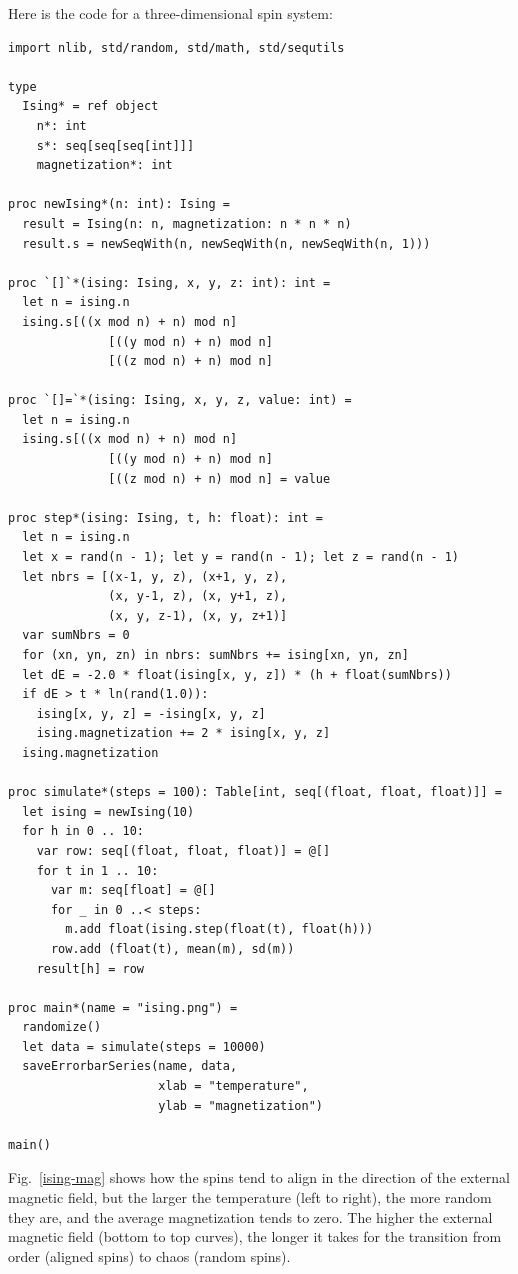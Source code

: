 \documentclass[justified, sixbynine]{tufte-book}
\def\ft{\small\tt}
\theoremstyle{plain}%
\newtheorem * {corollary}{Corollary}
\theoremstyle{definition}
\theoremstyle{remark}
\newtheorem * {remark}{Remark}
\newtheorem * {note}{Note}
\begin{document}
\begin{fullwidth}
Here is the code for a three-dimensional spin system:


\begin{lstlisting}[caption={in file: {\ft ising.nim}}]
import nlib, std/random, std/math, std/sequtils

type
  Ising* = ref object
    n*: int
    s*: seq[seq[seq[int]]]
    magnetization*: int

proc newIsing*(n: int): Ising =
  result = Ising(n: n, magnetization: n * n * n)
  result.s = newSeqWith(n, newSeqWith(n, newSeqWith(n, 1)))

proc `[]`*(ising: Ising, x, y, z: int): int =
  let n = ising.n
  ising.s[((x mod n) + n) mod n]
              [((y mod n) + n) mod n]
              [((z mod n) + n) mod n]

proc `[]=`*(ising: Ising, x, y, z, value: int) =
  let n = ising.n
  ising.s[((x mod n) + n) mod n]
              [((y mod n) + n) mod n]
              [((z mod n) + n) mod n] = value

proc step*(ising: Ising, t, h: float): int =
  let n = ising.n
  let x = rand(n - 1); let y = rand(n - 1); let z = rand(n - 1)
  let nbrs = [(x-1, y, z), (x+1, y, z),
              (x, y-1, z), (x, y+1, z),
              (x, y, z-1), (x, y, z+1)]
  var sumNbrs = 0
  for (xn, yn, zn) in nbrs: sumNbrs += ising[xn, yn, zn]
  let dE = -2.0 * float(ising[x, y, z]) * (h + float(sumNbrs))
  if dE > t * ln(rand(1.0)):
    ising[x, y, z] = -ising[x, y, z]
    ising.magnetization += 2 * ising[x, y, z]
  ising.magnetization

proc simulate*(steps = 100): Table[int, seq[(float, float, float)]] =
  let ising = newIsing(10)
  for h in 0 .. 10:
    var row: seq[(float, float, float)] = @[]
    for t in 1 .. 10:
      var m: seq[float] = @[]
      for _ in 0 ..< steps:
        m.add float(ising.step(float(t), float(h)))
      row.add (float(t), mean(m), sd(m))
    result[h] = row

proc main*(name = "ising.png") =
  randomize()
  let data = simulate(steps = 10000)
  saveErrorbarSeries(name, data,
                     xlab = "temperature",
                     ylab = "magnetization")

main()
\end{lstlisting}


Fig.~\ref{ising-mag} shows how the spins tend to align in the direction of the external magnetic field, but the larger the temperature (left to right), the more random they are, and the average magnetization tends to zero. The higher the external magnetic field (bottom to top curves), the longer it takes for the transition from order (aligned spins) to chaos (random spins).


\end{fullwidth}
\end{document}
